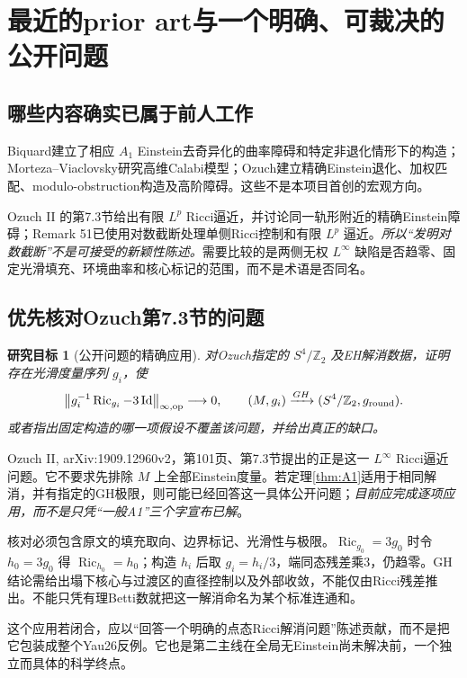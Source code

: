 \documentclass[UTF8,a4paper,11pt,fontset=fandol]{ctexart}
\numberwithin{equation}{section}
\newtheorem{target}[theorem]{研究目标}
\theoremstyle{definition}
\newcommand{\Ric}{\operatorname{Ric}}
\newcommand{\Id}{\operatorname{Id}}
\newcommand{\op}{\mathrm{op}}
\newcommand{\Z}{\mathbb Z}
\newcommand{\norm}[1]{\left\lVert#1\right\rVert}
\begin{document}
\section{最近的prior art与一个明确、可裁决的公开问题}
\subsection{哪些内容确实已属于前人工作}
Biquard建立了相应 $A_1$ Einstein去奇异化的曲率障碍和特定非退化情形下的构造；Morteza--Viaclovsky研究高维Calabi模型；Ozuch建立精确Einstein退化、加权匹配、modulo-obstruction构造及高阶障碍\cite{Biquard,MV,OzuchI,OzuchII,OzuchHigher,OzuchIntegrability}。这些不是本项目首创的宏观方向。

Ozuch II 的第7.3节给出有限 $L^p$ Ricci逼近，并讨论同一轨形附近的精确Einstein障碍；Remark 51已使用对数截断处理单侧Ricci控制和有限 $L^p$ 逼近。\emph{所以“发明对数截断”不是可接受的新颖性陈述。}需要比较的是两侧无权 $L^\infty$ 缺陷是否趋零、固定光滑填充、环境曲率和核心标记的范围，而不是术语是否同名\cite{OzuchII}。

\subsection{优先核对Ozuch第7.3节的问题}
\begin{target}[公开问题的精确应用]\label{tar:football}
对Ozuch指定的 $S^4/\Z_2$ 及EH解消数据，证明存在光滑度量序列 $g_i$，使
\begin{equation}\label{eq:football}
\norm{g_i^{-1}\Ric_{g_i}-3\Id}_{\infty,\op}\longrightarrow0,
\qquad (M,g_i)\xrightarrow{GH}(S^4/\Z_2,g_{\rm round}).
\end{equation}
或者指出固定构造的哪一项假设不覆盖该问题，并给出真正的缺口。
\end{target}
Ozuch II, arXiv:1909.12960v2，第101页、第7.3节提出的正是这一 $L^\infty$ Ricci逼近问题\cite{OzuchII}。它不要求先排除 $M$ 上全部Einstein度量。若定理\ref{thm:A1}适用于相同解消，并有指定的GH极限，则可能已经回答这一具体公开问题；\emph{目前应完成逐项应用，而不是只凭“一般A1”三个字宣布已解}。

核对必须包含原文的填充取向、边界标记、光滑性与极限。$\Ric_{g_0}=3g_0$ 时令 $h_0=3g_0$ 得 $\Ric_{h_0}=h_0$；构造 $h_i$ 后取 $g_i=h_i/3$，端同态残差乘3，仍趋零。GH结论需给出塌下核心与过渡区的直径控制以及外部收敛，不能仅由Ricci残差推出。不能只凭有理Betti数就把这一解消命名为某个标准连通和。

这个应用若闭合，应以“回答一个明确的点态Ricci解消问题”陈述贡献，而不是把它包装成整个Yau26反例。它也是第二主线在全局无Einstein尚未解决前，一个独立而具体的科学终点。
\end{document}
